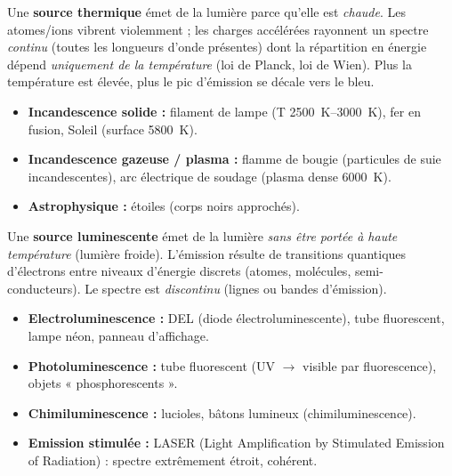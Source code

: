 \documentclass[11pt]{article}
\begin{document}
\begin{propriete}
Une \textbf{source thermique} émet de la lumière parce qu'elle est \emph{chaude}. Les atomes/ions vibrent violemment ; les charges accélérées rayonnent un spectre \emph{continu} (toutes les longueurs d'onde présentes) dont la répartition en énergie dépend \emph{uniquement de la température} (loi de Planck, loi de Wien). Plus la température est élevée, plus le pic d'émission se décale vers le bleu.
\begin{itemize}
    \item \textbf{Incandescence solide :} filament de lampe (T \approx \SIrange{2500}{3000}{\kelvin}), fer en fusion, Soleil (surface \approx \SI{5800}{\kelvin}).
    \item \textbf{Incandescence gazeuse / plasma :} flamme de bougie (particules de suie incandescentes), arc électrique de soudage (plasma dense \approx \SI{6000}{\kelvin}).
    \item \textbf{Astrophysique :} étoiles (corps noirs approchés).
\end{itemize}
\end{propriete}

\begin{propriete}
Une \textbf{source luminescente} émet de la lumière \emph{sans être portée à haute température} (lumière froide). L'émission résulte de transitions quantiques d'électrons entre niveaux d'énergie discrets (atomes, molécules, semi-conducteurs). Le spectre est \emph{discontinu} (lignes ou bandes d'émission).
\begin{itemize}
    \item \textbf{Electroluminescence :} DEL (diode électroluminescente), tube fluorescent, lampe néon, panneau d'affichage.
    \item \textbf{Photoluminescence :} tube fluorescent (UV $\to$ visible par fluorescence), objets « phosphorescents ».
    \item \textbf{Chimiluminescence :} lucioles, bâtons lumineux (chimiluminescence).
    \item \textbf{Emission stimulée :} LASER (Light Amplification by Stimulated Emission of Radiation) : spectre extrêmement étroit, cohérent.
\end{itemize}
\end{propriete}
\end{document}
